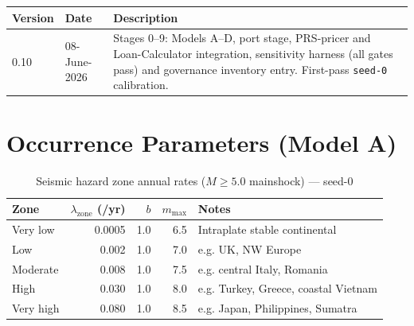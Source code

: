 \documentclass[11pt,a4paper]{article}
\begin{document}


\mkmchangelog

\begin{table}[H]
  \centering
  \begin{tabular}{lll}
    \toprule
    \textbf{Version} & \textbf{Date} & \textbf{Description} \\
    \midrule
    0.10 & 08-June-2026 & Stages 0--9: Models A--D, port stage, PRS-pricer and
    Loan-Calculator integration, sensitivity harness (all gates pass) and
    governance inventory entry. First-pass \texttt{seed-0} calibration. \\
    \bottomrule
  \end{tabular}
\end{table}

\appendix

\section{Occurrence Parameters (Model A)}\label{app:occ}

\begin{table}[H]
  \centering
  \caption{Seismic hazard zone annual rates ($M \ge 5.0$ mainshock) --- seed-0}
  \begin{tabular}{lrrrl}
    \toprule
    \textbf{Zone} & \textbf{$\lambda_{\text{zone}}$ (/yr)} & \textbf{$b$} &
    \textbf{$m_{\max}$} & \textbf{Notes} \\
    \midrule
    Very low  & 0.0005 & 1.0 & 6.5 & Intraplate stable continental \\
    Low       & 0.002  & 1.0 & 7.0 & e.g. UK, NW Europe \\
    Moderate  & 0.008  & 1.0 & 7.5 & e.g. central Italy, Romania \\
    High      & 0.030  & 1.0 & 8.0 & e.g. Turkey, Greece, coastal Vietnam \\
    Very high & 0.080  & 1.0 & 8.5 & e.g. Japan, Philippines, Sumatra \\
    \bottomrule
  \end{tabular}
\end{table}
\end{document}
